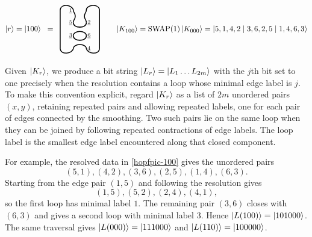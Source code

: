 \documentclass[a4paper,onecolumn,unpublished]{quantumarticle}
\theoremstyle{plain}
\theoremstyle{definition}
\theoremstyle{definition}
\numberwithin{equation}{section}
\newcommand{\hackcenter}[1]{
 \xy (0,0)*{#1}; \endxy}
\begin{document}
\begin{equation} \label{hopfpic-100}
\ket{r} = \ket{100} \;\; = \;\; %
\hackcenter{   \begin{tikzpicture}[scale=.6]
      \draw [ very thick]    (1,1) .. controls +(0,.45) and +(0, .45) .. (2,1);
  \draw [ very thick]    (1,2) .. controls +(0,.45) and +(0,.45) .. (2,2);
   \draw [ very thick]    (1,3) .. controls ++(0,.25) and ++(0,-.25) ..  (1.15,3.5)
                                .. controls ++(0,.25) and ++(0,-.25) .. (1,4);
  \draw [ very thick]    (2,2) .. controls +(0,-.45) and +(0,-.45) .. (1,2);
  \draw [ very thick]    (2,3) .. controls +(0,-.45) and +(0,-.45) .. (1,3);
    \draw [ very thick]    (2,3) .. controls ++(0,.25) and ++(0,-.25) ..  (1.85,3.5)
                               .. controls ++(0,.25) and ++(0,-.25) .. (2,4);
  \draw [ very thick]    (1,4) .. controls +(-.1,.35) and +(+.1,.5) .. (0,4);
  \draw [ very thick]    (2,4) .. controls +(0,.35) and +(-.1,.5) .. (3,4);
  \draw [ very thick]    (0,4) -- (0,1);
  \draw [ very thick]    (3,4) -- (3,1);
  \draw [ very thick]    (1,1) .. controls +(-0.1,-0.35) and+(+0.1,-0.5) .. (0,1);
  \draw [ very thick]    (2,1) .. controls +(0.1,-0.35) and +(-0.1,-0.5) .. (3,1);
  \node at (.8,3.9) {$\scriptstyle\underline{1}$};
   \node at (2.2,3) {$\scriptstyle\underline{2}$};
   \node at (2.2,2) {$\scriptstyle\underline{6}$};
   \node at (.8,3) {$\scriptstyle\underline{5}$};
   \node at (2.2,1) {$\scriptstyle\underline{4}$};
  \node at (.8,2) {$\scriptstyle\underline{3}$};
    \end{tikzpicture}  }
\qquad
\ket{K_{100}} = \text{SWAP}(1)\ket{K_{000}} = \ket{ 5,1, 4,2 \mid 3,6,2,5 \mid 1,4,6,3 }
\end{equation}

Given $\ket{K_r}$, we produce a bit string $\ket{L_r}=\ket{L_1\dots L_{2m}}$ with the $j$th bit set to one precisely when the resolution contains a loop whose minimal edge label is $j$.  To make this convention explicit, regard $\ket{K_r}$ as a list of $2m$ unordered pairs $(x,y)$, retaining repeated pairs and allowing repeated labels, one for each pair of edges connected by the smoothing.  Two such pairs lie on the same loop when they can be joined by following repeated contractions of edge labels.  The loop label is the smallest edge label encountered along that closed component.

For example, the resolved data in \cref{hopfpic-100} gives the unordered pairs
\[
(5,1), (4,2),  (3,6), (2,5), (1,4), (6,3).
\]
Starting from the edge pair $(1,5)$ and following the resolution gives
\[
(1,5), (5,2), (2,4), (4,1),
\]
so the first loop has minimal label $1$.  The remaining pair $(3,6)$ closes with $(6,3)$ and gives a second loop with minimal label $3$.  Hence $\ket{L(100)}=\ket{101000}$.  The same traversal gives $\ket{L(000)}=\ket{111000}$ and $\ket{L(110)}=\ket{100000}$.
\end{document}

